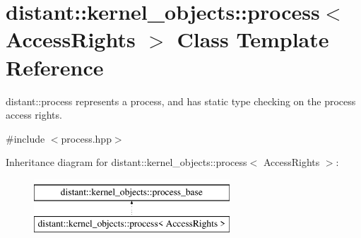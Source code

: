 \hypertarget{classdistant_1_1kernel__objects_1_1process}{}\section{distant\+:\+:kernel\+\_\+objects\+:\+:process$<$ Access\+Rights $>$ Class Template Reference}
\label{classdistant_1_1kernel__objects_1_1process}


distant\+::process represents a process, and has static type checking on the process access rights.  




{\ttfamily \#include $<$process.\+hpp$>$}

Inheritance diagram for distant\+:\+:kernel\+\_\+objects\+:\+:process$<$ Access\+Rights $>$\+:\begin{figure}[H]
\begin{center}
\leavevmode
\includegraphics[height=2.000000cm]{classdistant_1_1kernel__objects_1_1process}
\end{center}
\end{figure}
